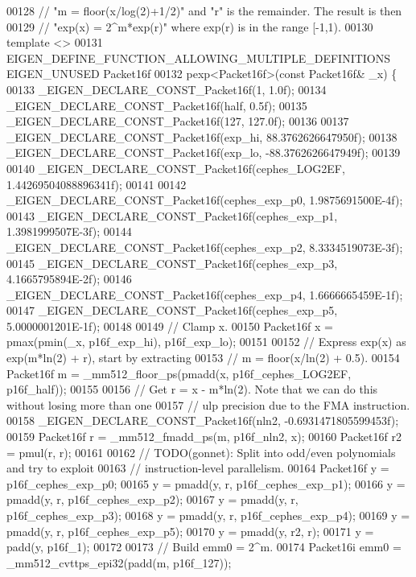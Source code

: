 \begin{DoxyCode}
00128 \textcolor{comment}{// "m = floor(x/log(2)+1/2)" and "r" is the remainder. The result is then}
00129 \textcolor{comment}{// "exp(x) = 2^m*exp(r)" where exp(r) is in the range [-1,1).}
00130 \textcolor{keyword}{template} <>
00131 EIGEN\_DEFINE\_FUNCTION\_ALLOWING\_MULTIPLE\_DEFINITIONS EIGEN\_UNUSED Packet16f
00132 pexp<Packet16f>(\textcolor{keyword}{const} Packet16f& \_x) \{
00133   \_EIGEN\_DECLARE\_CONST\_Packet16f(1, 1.0f);
00134   \_EIGEN\_DECLARE\_CONST\_Packet16f(half, 0.5f);
00135   \_EIGEN\_DECLARE\_CONST\_Packet16f(127, 127.0f);
00136 
00137   \_EIGEN\_DECLARE\_CONST\_Packet16f(exp\_hi, 88.3762626647950f);
00138   \_EIGEN\_DECLARE\_CONST\_Packet16f(exp\_lo, -88.3762626647949f);
00139 
00140   \_EIGEN\_DECLARE\_CONST\_Packet16f(cephes\_LOG2EF, 1.44269504088896341f);
00141 
00142   \_EIGEN\_DECLARE\_CONST\_Packet16f(cephes\_exp\_p0, 1.9875691500E-4f);
00143   \_EIGEN\_DECLARE\_CONST\_Packet16f(cephes\_exp\_p1, 1.3981999507E-3f);
00144   \_EIGEN\_DECLARE\_CONST\_Packet16f(cephes\_exp\_p2, 8.3334519073E-3f);
00145   \_EIGEN\_DECLARE\_CONST\_Packet16f(cephes\_exp\_p3, 4.1665795894E-2f);
00146   \_EIGEN\_DECLARE\_CONST\_Packet16f(cephes\_exp\_p4, 1.6666665459E-1f);
00147   \_EIGEN\_DECLARE\_CONST\_Packet16f(cephes\_exp\_p5, 5.0000001201E-1f);
00148 
00149   \textcolor{comment}{// Clamp x.}
00150   Packet16f x = pmax(pmin(\_x, p16f\_exp\_hi), p16f\_exp\_lo);
00151 
00152   \textcolor{comment}{// Express exp(x) as exp(m*ln(2) + r), start by extracting}
00153   \textcolor{comment}{// m = floor(x/ln(2) + 0.5).}
00154   Packet16f m = \_mm512\_floor\_ps(pmadd(x, p16f\_cephes\_LOG2EF, p16f\_half));
00155 
00156   \textcolor{comment}{// Get r = x - m*ln(2). Note that we can do this without losing more than one}
00157   \textcolor{comment}{// ulp precision due to the FMA instruction.}
00158   \_EIGEN\_DECLARE\_CONST\_Packet16f(nln2, -0.6931471805599453f);
00159   Packet16f r = \_mm512\_fmadd\_ps(m, p16f\_nln2, x);
00160   Packet16f r2 = pmul(r, r);
00161 
00162   \textcolor{comment}{// TODO(gonnet): Split into odd/even polynomials and try to exploit}
00163   \textcolor{comment}{//               instruction-level parallelism.}
00164   Packet16f y = p16f\_cephes\_exp\_p0;
00165   y = pmadd(y, r, p16f\_cephes\_exp\_p1);
00166   y = pmadd(y, r, p16f\_cephes\_exp\_p2);
00167   y = pmadd(y, r, p16f\_cephes\_exp\_p3);
00168   y = pmadd(y, r, p16f\_cephes\_exp\_p4);
00169   y = pmadd(y, r, p16f\_cephes\_exp\_p5);
00170   y = pmadd(y, r2, r);
00171   y = padd(y, p16f\_1);
00172 
00173   \textcolor{comment}{// Build emm0 = 2^m.}
00174   Packet16i emm0 = \_mm512\_cvttps\_epi32(padd(m, p16f\_127));

\end{DoxyCode}
